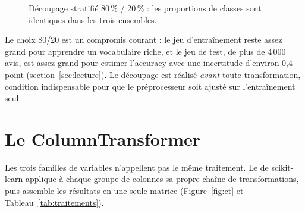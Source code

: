 \documentclass[11pt,a4paper]{report}
\makeatletter
\numberwithin{equation}{chapter}
\DeclareRobustCommand{\code}[1]{{\ttfamily\fontsize{\strip@pt\dimexpr\f@size pt*9/10\relax}{\f@baselineskip}\selectfont\detokenize{#1}}}
\makeatother
\begin{document}
\begin{figure}[!htbp]
\centering
{}
\caption{Découpage stratifié 80\,\% / 20\,\% : les proportions de classes sont identiques dans les trois ensembles.}\label{fig:split}
\end{figure}

Le choix 80/20 est un compromis courant : le jeu d'entraînement reste assez grand pour apprendre un vocabulaire riche, et le jeu de test, de plus de 4\,000 avis, est assez grand pour estimer l'accuracy avec une incertitude d'environ 0,4 point (section~\ref{sec:lecture}). Le découpage est réalisé \textit{avant} toute transformation, condition indispensable pour que le préprocesseur soit ajusté sur l'entraînement seul.

\section{Le ColumnTransformer}
Les trois familles de variables n'appellent pas le même traitement. Le \code{ColumnTransformer} de scikit-learn applique à chaque groupe de colonnes sa propre chaîne de transformations, puis assemble les résultats en une seule matrice (Figure~\ref{fig:ct} et Tableau~\ref{tab:traitements}).
\end{document}
